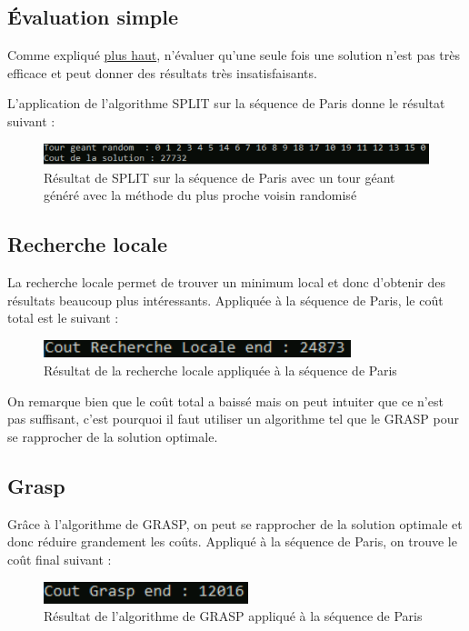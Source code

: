 \documentclass[12pt]{article}
\begin{document}
	\subsection{Évaluation simple}
	Comme expliqué \hyperlink{eval}{plus haut}, n'évaluer qu'une seule fois une solution n'est pas très efficace et peut donner des résultats très insatisfaisants.\\\par
	L'application de l'algorithme SPLIT sur la séquence de Paris donne le résultat suivant :\\\par
        \begin{figure}[!h]
	    \centering
	    \includegraphics[scale = 1]{res_eval.png}
	    \caption{Résultat de SPLIT sur la séquence de Paris avec un tour géant généré avec la méthode du plus proche voisin randomisé}
	    \label{fig6}
	\end{figure}\par
	\newpage
	\subsection{Recherche locale}
	La recherche locale permet de trouver un minimum local et donc d'obtenir des résultats beaucoup plus intéressants. Appliquée à la séquence de Paris, le coût total est le suivant :\\\par
    \begin{figure}[!h]
	    \centering
	    \includegraphics[scale = 1]{local.png}
	    \caption{Résultat de la recherche locale appliquée à la séquence de Paris}
	    \label{fig7}
	\end{figure}\par
    On remarque bien que le coût total a baissé mais on peut intuiter que ce n'est pas suffisant, c'est pourquoi il faut utiliser un algorithme tel que le GRASP pour se rapprocher de la solution optimale.
	
    \subsection{Grasp}
    Grâce à l'algorithme de GRASP, on peut se rapprocher de la solution optimale et donc réduire grandement les coûts. Appliqué à la séquence de Paris, on trouve le coût final suivant :
    \begin{figure}[!h]
	    \centering
	    \includegraphics[scale = 1]{grasp.png}
	    \caption{Résultat de l'algorithme de GRASP appliqué à la séquence de Paris}
	    \label{fig8}
	\end{figure}\par
\end{document}
